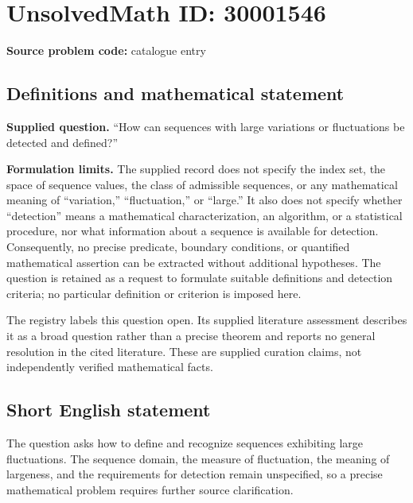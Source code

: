 \documentclass[11pt]{article}
\begin{document}
\section*{UnsolvedMath ID: 30001546}
\textbf{Source problem code:} catalogue entry
\subsection{Definitions and mathematical statement}
\textbf{Supplied question.} ``How can sequences with large variations or fluctuations be detected and defined?''

\textbf{Formulation limits.} The supplied record does not specify the index set, the space of sequence values, the class of admissible sequences, or any mathematical meaning of ``variation,'' ``fluctuation,'' or ``large.'' It also does not specify whether ``detection'' means a mathematical characterization, an algorithm, or a statistical procedure, nor what information about a sequence is available for detection. Consequently, no precise predicate, boundary conditions, or quantified mathematical assertion can be extracted without additional hypotheses. The question is retained as a request to formulate suitable definitions and detection criteria; no particular definition or criterion is imposed here.

The registry labels this question open. Its supplied literature assessment describes it as a broad question rather than a precise theorem and reports no general resolution in the cited literature. These are supplied curation claims, not independently verified mathematical facts.
\subsection{Short English statement}
The question asks how to define and recognize sequences exhibiting large fluctuations. The sequence domain, the measure of fluctuation, the meaning of largeness, and the requirements for detection remain unspecified, so a precise mathematical problem requires further source clarification.
\end{document}
